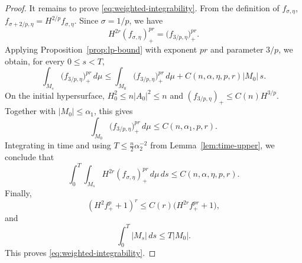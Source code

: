 \documentclass[11pt,reqno]{amsart}
\theoremstyle{definition}
\theoremstyle{remark}
\numberwithin{equation}{section}
\begin{document}
\begin{proof}
It remains to prove \eqref{eq:weighted-integrability}.  From the definition
of $f_{\sigma,\eta}$, $ f_{\sigma+2/p,\eta}
 =H^{2/p}f_{\sigma,\eta}$.  
Since $\sigma=1/p$, we have
\begin{equation*}
 H^{2r}(f_{\sigma,\eta})_+^{pr}
 =\bigl(f_{3/p,\eta}\bigr)_+^{pr}.
\end{equation*}
Applying Proposition~\ref{prop:lp-bound} with exponent $pr$ and parameter
$3/p$, we obtain, for every $0\leq s<T$,
\begin{equation*}
 \int_{M_s}\bigl(f_{3/p,\eta}\bigr)_+^{pr}\,d\mu
 \leq
 \int_{M_0}\bigl(f_{3/p,\eta}\bigr)_+^{pr}\,d\mu
 +C(n,\alpha,\eta,p,r)|M_0|\,s.
\end{equation*}
On the initial hypersurface, $ H_0^2\leq n|A_0|^2\leq n$  
and
$(f_{3/p,\eta})_+\leq C(n)H^{3/p}$.  Together with
$|M_0|\leq\alpha_1$, this gives
\begin{equation*}
 \int_{M_0}\bigl(f_{3/p,\eta}\bigr)_+^{pr}\,d\mu
 \leq C(n,\alpha_1,p,r).
\end{equation*}
Integrating in time and using $T\leq\frac n2\alpha_2^{-2}$ 
from Lemma~\ref{lem:time-upper}, we conclude that
\begin{equation*}
 \int_0^T\!\!\int_{M_s}
 H^{2r}(f_{\sigma,\eta})_+^{pr}\,d\mu\,ds
 \leq C(n,\alpha,\eta,p,r).
\end{equation*}
Finally,
\begin{equation*}
 (H^2f_+^p+1)^r
 \leq C(r)\bigl(H^{2r}f_+^{pr}+1\bigr),
\end{equation*}
and
\begin{equation*}
 \int_0^T|M_s|\,ds\leq T|M_0|.
\end{equation*}
This proves \eqref{eq:weighted-integrability}.
\end{proof}
\end{document}
